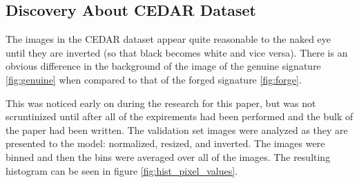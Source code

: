 






\subsection{Discovery About CEDAR Dataset}\label{sec:cedar_flaw}
The images in the CEDAR dataset appear quite reasonable to the naked eye until they are inverted (so that black becomes white and vice versa).
There is an obvious difference in the background of the image of the genuine signature \ref{fig:genuine} when compared to that of the forged signature \ref{fig:forge}.

This was noticed early on during the research for this paper, but was not scruntinized until after all of the expirements had been performed and the bulk of the paper had been written.
The validation set images were analyzed as they are presented to the model: normalized, resized, and inverted.
The images were binned and then the bins were averaged over all of the images.
The resulting histogram can be seen in figure \ref{fig:hist_pixel_values}.

